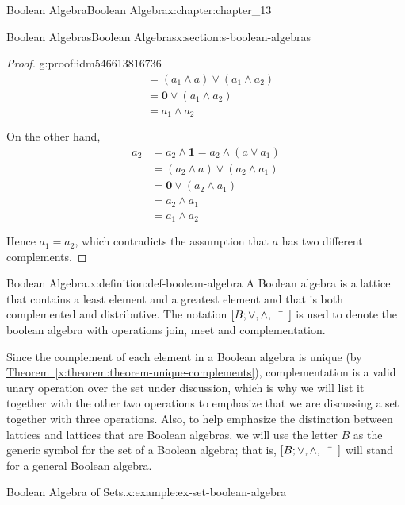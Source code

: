 \documentclass[oneside,10pt,]{book}
\newcommand{\xreffont}{\relax}
\numberwithin{equation}{section}
\begin{document}
\begin{chapterptx}{Boolean Algebra}{}{Boolean Algebra}{}{}{x:chapter:chapter_13}
\begin{sectionptx}{Boolean Algebras}{}{Boolean Algebras}{}{}{x:section:s-boolean-algebras}
\begin{proof}{}{g:proof:idm546613816736}
\begin{equation*}
\begin{split}
&=\left(a_1 \land  a\right) \lor  \left(a_1 \land  a_2\right)\\
&=\pmb{0} \lor  \left(a_1 \land  a_2\right)\\
&=a_1 \land  a_2\\
\\
\end{split}
\end{equation*}
On the other hand,%
\begin{equation*}
\begin{split}
a_2 &= a_2 \land  \pmb{1} = a_2 \land  \left(a \lor  a_1\right)\\
&= \left(a_2 \land  a\right) \lor  \left(a_2 \land  a_1\right)\\
&=  \pmb{0} \lor  \left(a_2 \land  a_1\right)\\
&= a_2 \land  a_1\\
&= a_1 \land  a_2\\
\\
\end{split}
\end{equation*}
Hence \(a_1 = a_2\), which contradicts the assumption that \(a\) has two different complements.%
\end{proof}
\begin{definition}{Boolean Algebra.}{x:definition:def-boolean-algebra}%
%
\label{g:notation:idm546613811152}%
A Boolean algebra is a lattice that contains a least element and a greatest element and that is both complemented and distributive. The notation \([B;  \lor , \land, \bar{\hspace{5 mm}}]\) is used to denote the boolean algebra with operations join, meet and complementation.%
\end{definition}
Since the complement of each element in a Boolean algebra is unique (by \hyperref[x:theorem:theorem-unique-complements]{Theorem~{\xreffont\ref{x:theorem:theorem-unique-complements}}}), complementation is a valid unary operation over the set under discussion, which is why we will list it together with the other two operations to emphasize that we are discussing a set together with three operations. Also, to help emphasize the distinction between lattices and lattices that are Boolean algebras, we will use the letter \(B\) as the generic symbol for the set of a Boolean algebra; that is, \([B; \lor , \land, \bar{\hspace{5 mm}} ]\) will stand for a general Boolean algebra.%
\begin{example}{Boolean Algebra of Sets.}{x:example:ex-set-boolean-algebra}%

\end{example}
\end{sectionptx}
\end{chapterptx}
\end{document}
